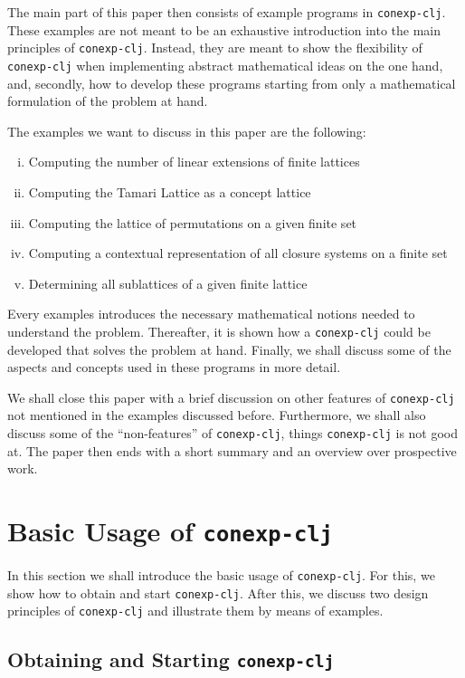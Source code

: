 \documentclass[oneside]{llncs}
\newcommand{\cclj}{\texttt{conexp-clj}\xspace}
\begin{document}
The main part of this paper then consists of example programs in \cclj.  These examples
are not meant to be an exhaustive introduction into the main principles of \cclj.
Instead, they are meant to show the flexibility of \cclj when implementing abstract
mathematical ideas on the one hand, and, secondly, how to develop these programs starting
from only a mathematical formulation of the problem at hand.

The examples we want to discuss in this paper are the following:
\begin{enumerate}[i. ]
\item Computing the number of linear extensions of finite lattices
\item Computing the Tamari Lattice as a concept lattice
\item Computing the lattice of permutations on a given finite set
\item Computing a contextual representation of all closure systems on a finite set
\item Determining all sublattices of a given finite lattice
\end{enumerate}
Every examples introduces the necessary mathematical notions needed to understand the
problem.  Thereafter, it is shown how a \cclj could be developed that solves the problem
at hand.  Finally, we shall discuss some of the aspects and concepts used in these
programs in more detail.

We shall close this paper with a brief discussion on other features of \cclj not mentioned
in the examples discussed before.  Furthermore, we shall also discuss some of the
``non-features'' of \cclj, \ie things \cclj is not good at.  The paper then ends with a
short summary and an overview over prospective work.

\section{Basic Usage of \cclj}
\label{sec:design-princ-cclj}

In this section we shall introduce the basic usage of \cclj.  For this, we show how to
obtain and start \cclj.  After this, we discuss two design principles of \cclj and
illustrate them by means of examples.

\subsection{Obtaining and Starting \cclj}
\label{sec:obta-start-cclj}
\end{document}
